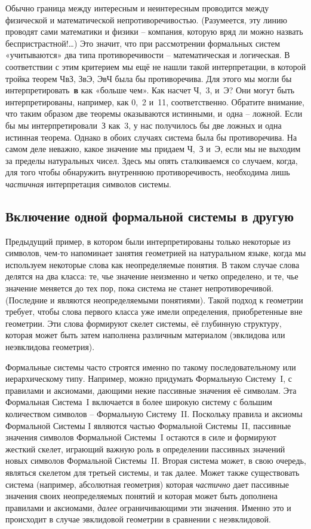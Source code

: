\documentclass[../main.tex]{subfiles}
\begin{document}
Обычно граница между интересным и неинтересным проводится между физической и математической непротиворечивостью. (Разумеется, эту линию проводят сами математики и физики \--- компания, которую вряд ли можно назвать беспристрастной!\ldots) Это значит, что при рассмотрении формальных систем «учитываются» два типа противоречивости \--- математическая и логическая. В соответствии с этим критерием мы ещё не нашли такой интерпретации, в которой тройка теорем ЧвЗ, ЗвЭ, ЭвЧ была бы противоречива. Для этого мы могли бы интерпретировать~\textbf{в} как «больше чем». Как насчет Ч,~3, и~Э? Они могут быть интерпретированы, например, как 0,~2 и~11, соответственно. Обратите внимание, что таким образом две теоремы оказываются истинными, и~одна \--- ложной. Если бы мы интерпретировали~З как~3, у нас получилось бы две ложных и одна истинная теорема. Однако в обоих случаях система была бы противоречива. На самом деле неважно, какое значение мы придаем Ч,~З и~Э, если мы не выходим за пределы натуральных чисел. Здесь мы опять сталкиваемся со случаем, когда, для того чтобы обнаружить внутреннюю противоречивость, необходима лишь \emph{частичная} интерпретация символов системы.


\subsection{Включение одной формальной системы в другую}

Предыдущий пример, в котором были интерпретированы только некоторые из символов, чем-то напоминает занятия геометрией на натуральном языке, когда мы используем некоторые слова как неопределяемые понятия. В таком случае слова делятся на два класса: те, чье значение неизменно и четко определено, и те, чье значение меняется до тех пор, пока система не станет непротиворечивой. (Последние и являются неопределяемыми понятиями). Такой подход к геометрии требует, чтобы слова первого класса уже имели определения, приобретенные вне геометрии. Эти слова формируют скелет системы, её глубинную структуру, которая может быть затем наполнена различным материалом (эвклидова или неэвклидова геометрия).

Формальные системы часто строятся именно по такому последовательному или иерархическому типу. Например, можно придумать Формальную Систему~I, с правилами и аксиомами, дающими некие пассивные значения её символам. Эта Формальная Система~I включается в более широкую систему с большим количеством символов \--- Формальную Систему~II\@. Поскольку правила и аксиомы Формальной Системы I являются частью Формальной Системы~II, пассивные значения символов Формальной Системы~I остаются в силе и формируют жесткий скелет, играющий важную роль в определении пассивных значений новых символов Формальной Системы~II\@. Вторая система может, в свою очередь, являться скелетом для третьей системы, и так далее. Может также существовать система (например, абсолютная геометрия) которая \emph{частично} дает пассивные значения своих неопределяемых понятий и которая может быть дополнена правилами и аксиомами, \emph{далее} ограничивающими эти значения. Именно это и происходит в случае эвклидовой геометрии в сравнении с неэвклидовой.
\end{document}
